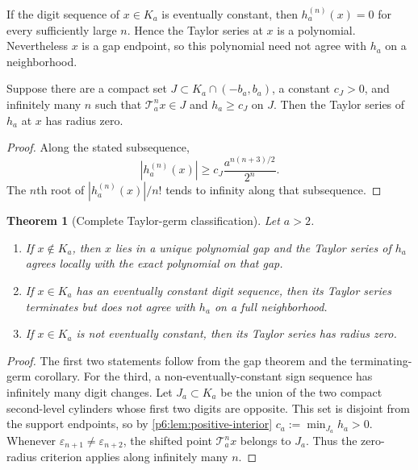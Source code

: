 \documentclass[11pt,oneside]{article}
\numberwithin{equation}{section}
\newtheorem{theorem}{Theorem}[section]
\theoremstyle{definition}
\theoremstyle{remark}
\begin{document}
\begin{corollary}
If the digit sequence of $x\in K_a$ is eventually constant, then
$h_a^{(n)}(x)=0$ for every sufficiently large $n$.  Hence the Taylor series at
$x$ is a polynomial.  Nevertheless $x$ is a gap endpoint, so this polynomial
need not agree with $h_a$ on a neighborhood.
\end{corollary}

\begin{corollary}\label{p6:cor:zero-radius-criterion}
Suppose there are a compact set $J\subset K_a\cap(-b_a,b_a)$, a constant
$c_J>0$, and infinitely many $n$ such that
$\mathcal T_a^nx\in J$ and $h_a\ge c_J$ on $J$.  Then the Taylor series of
$h_a$ at $x$ has radius zero.
\end{corollary}

\begin{proof}
Along the stated subsequence,
\[
 |h_a^{(n)}(x)|\ge c_J\frac{a^{n(n+3)/2}}{2^n}.
\]
The $n$th root of $|h_a^{(n)}(x)|/n!$ tends to infinity along that subsequence.
\end{proof}

\begin{theorem}[Complete Taylor-germ classification]\label{p6:thm:taylor-dichotomy}
Let $a>2$.
\begin{enumerate}
\item If $x\notin K_a$, then $x$ lies in a unique polynomial gap and the Taylor
series of $h_a$ agrees locally with the exact polynomial on that gap.
\item If $x\in K_a$ has an eventually constant digit sequence, then its Taylor
series terminates but does not agree with $h_a$ on a full neighborhood.
\item If $x\in K_a$ is not eventually constant, then its Taylor series has
radius zero.
\end{enumerate}
\end{theorem}

\begin{proof}
The first two statements follow from the gap theorem and the terminating-germ
corollary.  For the third, a non-eventually-constant sign sequence has infinitely
many digit changes.  Let $J_a\subset K_a$ be the union of the two compact
second-level cylinders whose first two digits are opposite.  This set is
disjoint from the support endpoints, so by \cref{p6:lem:positive-interior}
$c_a:=\min_{J_a}h_a>0$.  Whenever
$\varepsilon_{n+1}\ne\varepsilon_{n+2}$, the shifted point
$\mathcal T_a^n x$ belongs to $J_a$.  Thus the zero-radius criterion applies
along infinitely many $n$.
\end{proof}
\end{document}
